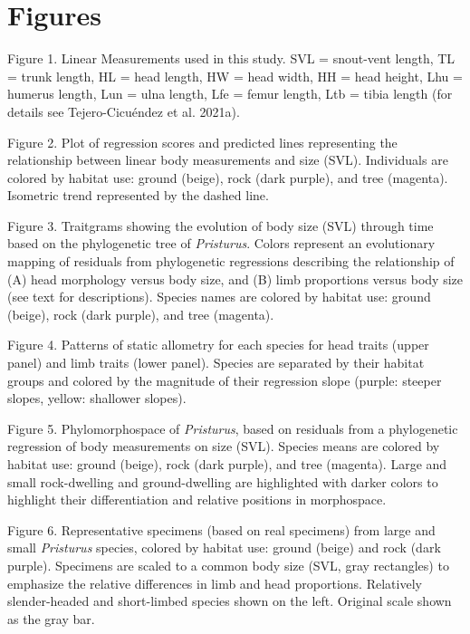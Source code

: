 \documentclass[
  11pt,
]{article}
\begin{document}
\newpage

\hypertarget{figures}{%
\section{Figures}\label{figures}}

Figure 1. Linear Measurements used in this study. SVL = snout-vent
length, TL = trunk length, HL = head length, HW = head width, HH = head
height, Lhu = humerus length, Lun = ulna length, Lfe = femur length, Ltb
= tibia length (for details see Tejero-Cicuéndez et al. 2021a).

Figure 2. Plot of regression scores and predicted lines representing the
relationship between linear body measurements and size (SVL).
Individuals are colored by habitat use: ground (beige), rock (dark
purple), and tree (magenta). Isometric trend represented by the dashed
line.

Figure 3. Traitgrams showing the evolution of body size (SVL) through
time based on the phylogenetic tree of \emph{Pristurus}. Colors
represent an evolutionary mapping of residuals from phylogenetic
regressions describing the relationship of (A) head morphology versus
body size, and (B) limb proportions versus body size (see text for
descriptions). Species names are colored by habitat use: ground (beige),
rock (dark purple), and tree (magenta).

Figure 4. Patterns of static allometry for each species for head traits
(upper panel) and limb traits (lower panel). Species are separated by
their habitat groups and colored by the magnitude of their regression
slope (purple: steeper slopes, yellow: shallower slopes).

Figure 5. Phylomorphospace of \emph{Pristurus}, based on residuals from
a phylogenetic regression of body measurements on size (SVL). Species
means are colored by habitat use: ground (beige), rock (dark purple),
and tree (magenta). Large and small rock-dwelling and ground-dwelling
are highlighted with darker colors to highlight their differentiation
and relative positions in morphospace.

Figure 6. Representative specimens (based on real specimens) from large
and small \textit{Pristurus} species, colored by habitat use: ground
(beige) and rock (dark purple). Specimens are scaled to a common body
size (SVL, gray rectangles) to emphasize the relative differences in
limb and head proportions. Relatively slender-headed and short-limbed
species shown on the left. Original scale shown as the gray bar.
\end{document}
